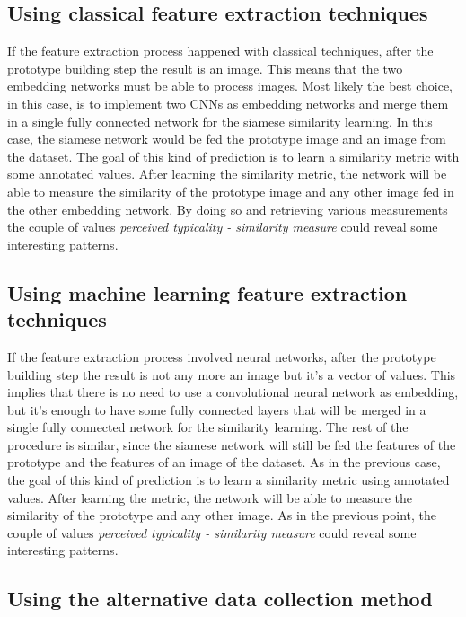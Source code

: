 \documentclass[conference]{IEEEtran}
\begin{document}
		\subsection{Using classical feature extraction techniques\label{sec:slcfet}}
		
			\noindent If the feature extraction process happened with classical techniques, after the prototype building step the result is an image. This means that the two embedding networks must be able to process 
			images. Most likely the best choice, in this case, is to implement two CNNs as embedding networks and merge them in a single fully connected network for the siamese similarity learning. 
			In this case, the siamese network would be fed the prototype image and an image from the dataset. The goal of this kind of prediction is to learn a similarity metric with some annotated values. 
			After learning the similarity metric, the network will be able to measure the similarity of the prototype image and any other image fed in the other embedding network. By doing so and retrieving various 
			measurements the couple of values \textit{perceived typicality - similarity measure} could reveal some interesting patterns.
		
		\subsection{Using machine learning feature extraction techniques\label{sec:slmlfet}}
		
			\noindent If the feature extraction process involved neural networks, after the prototype building step the result is not any more an image but it's a vector of values. This implies that there is no need to 
			use a convolutional neural network as embedding, but it's enough to have some fully connected layers that will be merged in a single fully connected network for the similarity learning. The rest of the procedure 
			is similar, since the siamese network will still be fed the features of the prototype and the features of an image of the dataset. As in the previous case, the goal of this kind of prediction is to learn 
			a similarity metric using annotated values. After learning the metric, the network will be able to measure the similarity of the prototype and any other image. 
			As in the previous point, the couple of values \textit{perceived typicality - similarity measure} could reveal some interesting patterns.
			
		\subsection{Using the alternative data collection method}
		
\end{document}
